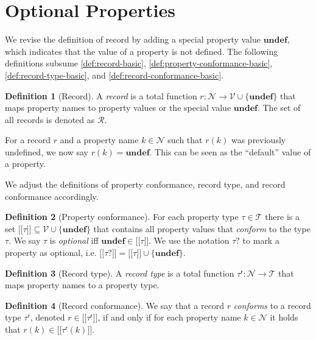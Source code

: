 \documentclass{report}
\theoremstyle{definition}
\newtheorem{definition}{Definition}
\newcommand{\ptype}{\tau}
\newcommand{\ptypes}{\mathcal{T}}
\newcommand{\rtype}{\tau^\mathsf{r}}
\newcommand{\lsem}{\ensuremath{[\![}}
\newcommand{\rsem}{\ensuremath{]\!]}}
\newcommand{\sem}[1]{\ensuremath{\lsem #1 \rsem}}
\newcommand{\undefined}{\mathbf{undef}}
\begin{document}
\section{Optional Properties}
\label{sec:optional-properties}

We revise the definition of record by adding a special property value $\undefined$, which indicates that the value of a property is not defined. The following definitions subsume \autoref{def:record-basic}, \ref{def:property-conformance-basic}, \ref{def:record-type-basic}, and \ref{def:record-conformance-basic}.

\begin{definition}[Record]
  \label{def:record}
  A \emph{record} is a total function $r : \mathcal{N} \to \mathcal{V} \cup \{\undefined\}$ that maps property names to property values or the special value $\undefined$. The set of all records is denoted as $\mathcal{R}$.
\end{definition}

For a record $r$ and a property name $k \in \mathcal{N}$ such that $r(k)$ was previously undefined, we now say $r(k) = \undefined$. This can be seen as the ``default'' value of a property.

We adjust the definitions of property conformance, record type, and record conformance accordingly.

\begin{definition}[Property conformance]
  \label{def:property-conformance}
  For each property type $\ptype \in \ptypes$ there is a set $\sem{\ptype} \subseteq \mathcal{V} \cup \{\undefined\}$ that contains all property values that \emph{conform} to the type $\ptype$. We say $\ptype$ is \emph{optional} iff $\undefined \in \sem{\ptype}$. We use the notation $\ptype?$ to mark a property as optional, i.e. $\sem{\ptype?} = \sem{\ptype} \cup \{ \undefined \}$.
\end{definition}

\begin{definition}[Record type]
  \label{def:record-type}
  A \emph{record type} is a total function $\rtype : \mathcal{N} \to \ptypes$ that maps property names to a property type.
\end{definition}

\begin{definition}[Record conformance]
  \label{def:record-conformance}
  We say that a record $r$ \emph{conforms} to a record type $\rtype$, denoted $r \in \sem{\rtype}$, if and only if for each property name $k \in \mathcal{N}$ it holds that $r(k) \in \sem{\rtype(k)}$.
\end{definition}
\end{document}
